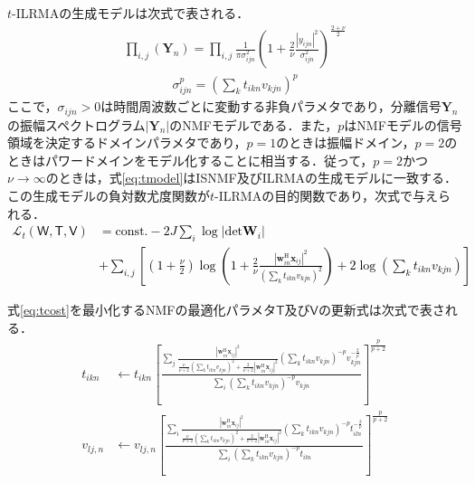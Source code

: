$t$-ILRMAの生成モデルは次式で表される．
\begin{align}
     \prod_{i,j}\left(\bm{Y}_{n}\right)= \prod_{i,j}\frac{1}{\pi \sigma_{ijn}^{2} } \left( 1+\frac{2}{\nu}\frac{|y_{ijn}|^2}{\sigma_{ijn}^{2}} \right)^{\frac{2+\nu}{2}}　\label{eq:tmodel}
\end{align}
\begin{align}
     \sigma_{ijn}^{p}=\left(\sum_{k}t_{ikn}v_{kjn}\right)^{p} \label{eq:tsigma}
\end{align}
ここで，$\sigma_{ijn}>0$は時間周波数ごとに変動する非負パラメタであり，分離信号$\bm{Y}_{n}$の振幅スペクトログラム$|\bm{Y}_{n}|$のNMFモデルである．また，$p$はNMFモデルの信号領域を決定するドメインパラメタであり，$p=1$のときは振幅ドメイン，$p=2$のときはパワードメインをモデル化することに相当する．従って，$p=2$かつ$\nu\rightarrow\infty$のときは，式\eqref{eq:tmodel}はISNMF及びILRMAの生成モデルに一致する．この生成モデルの負対数尤度関数が$t$-ILRMAの目的関数であり，次式で与えられる．
\textcolor{black}{
\begin{align}
    \nonumber \mathcal{L}_{t}(\mathsf{W, T, V}) &= \mathrm{const.}-2J \sum_{i}\log|\mathrm{det}\bm{W}_{i}| \\
&+ \sum_{i,j}\left\lbrack\left(1+\frac{\nu}{2}\right)\log\left(1+\frac{2}{\nu}\frac{|\bm{w}_{in}^{\mathrm{H}}\bm{x}_{ij}|^2}{\left(\sum_{k}t_{ikn}v_{kjn}\right)^2}\right)+2\log\left(\sum_{k}t_{ikn}v_{kjn}\right)\right\rbrack \label{eq:tcost}
\end{align}}

式\eqref{eq:tcost}を最小化するNMFの最適化パラメタ$\mathsf{T}$及び$\mathsf{V}$の更新式は次式で表される．
\begin{align}
    t_{ikn}&\leftarrow t_{ikn}\left\lbrack\frac{\sum_{j}\frac{|\bm{w}_{in}^{\mathrm{H}}\bm{x}_{ij}|^2}{\frac{\nu}{\nu+2}\left(\sum_{k}t_{ikn}v_{kjn}\right)^{2}+\frac{2}{\nu+2}|\bm{w}_{in}^{\mathrm{H}}\bm{x}_{ij}|^2}\left(\sum_{k}t_{ikn}v_{kjn}\right)^{-p}v_{kjn}^{-\frac{2}{p}}}{\sum_{i}\left(\sum_{k}t_{ikn}v_{kjn}\right)^{-p}v_{kjn}}\right\rbrack^{\frac{p}{p+2}} \label{eq:tt} \\
    v_{lj,n}&\leftarrow v_{lj,n}\left\lbrack\frac{\sum_{i}\frac{|\bm{w}_{in}^{\mathrm{H}}\bm{x}_{ij}|^2}{\frac{\nu}{\nu+2}\left(\sum_{k}t_{ikn}v_{kjn}\right)^{2}+\frac{2}{\nu+2}|\bm{w}_{in}^{\mathrm{H}}\bm{x}_{ij}|^2}\left(\sum_{k}t_{ikn}v_{kjn}\right)^{-p}t_{iln}^{-\frac{2}{p}}}{\sum_{i}\left(\sum_{k}t_{ikn}v_{kjn}\right)^{-p}t_{iln}}\right\rbrack^{\frac{p}{p+2}} \label{eq:tv}
\end{align}


